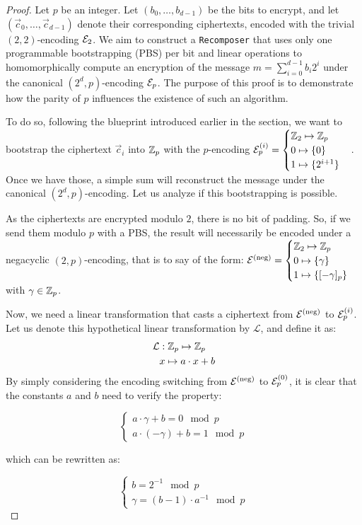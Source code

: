 \begin{proof}
Let $p$ be an integer. Let $(b_0, \dots, b_{d-1})$ be the bits to encrypt, and let $(\vec c_0, \dots, \vec c_{d - 1})$ denote their corresponding ciphertexts, encoded with the trivial $(2, 2)$-encoding $\mathcal{E}_2$. We aim to construct a \texttt{Recomposer} that uses only one programmable bootstrapping (\gls{PBS}) per bit and linear operations to homomorphically compute an encryption of the message $m = \sum_{i=0}^{d-1} b_i 2^i$ under the canonical $(2^d, p)$-encoding $\mathcal{E}_p$. The purpose of this proof is to demonstrate how the parity of $p$ influences the existence of such an algorithm.

To do so, following the blueprint introduced earlier in the section, we want to bootstrap the ciphertext $\vec c_i$ into $\mathbb{Z}_p$ with the $p$-encoding $\mathcal{E}_p^{(i)} = \begin{cases} \mathbb{Z}_2 \mapsto \mathbb{Z}_{p} \\ 0 \mapsto \{0\} \\ 1 \mapsto \{2^{i+1}\} \end{cases}$. Once we have those, a simple sum will reconstruct the message under the canonical $(2^d, p)$-encoding. Let us analyze if this bootstrapping is possible.

As the ciphertexts are encrypted modulo $2$, there is no bit of padding. So, if we send them modulo $p$ with a \gls{PBS}, the result will necessarily be encoded under a negacyclic $(2, p)$-encoding, that is to say of the form: $\mathcal{E}^{\text{(neg)}} = \begin{cases} \mathbb{Z}_2 \mapsto \mathbb{Z}_{p} \\ 0 \mapsto \{\gamma\} \\ 1 \mapsto \{[-\gamma]_p\} \end{cases}$ with $\gamma \in \mathbb{Z}_p$.

Now, we need a linear transformation that casts a ciphertext from $\mathcal{E}^{\text{(neg)}}$ to $\mathcal{E}_p^{(i)}$. Let us denote this hypothetical linear transformation by $\mathcal{L}$, and define it as: \begin{align*}
    \mathcal{L} &: \mathbb{Z}_p \mapsto \mathbb{Z}_p\\
    & x \mapsto a \cdot x + b
\end{align*} 
By simply considering the encoding switching from $\mathcal{E}^{\text{(neg)}}$ to $\mathcal{E}_p^{(0)}$, it is clear that the constants $a$ and $b$ need to verify the property:

\[
    \begin{cases}
        a \cdot \gamma + b = 0 \mod p\\
        a \cdot (- \gamma) + b = 1 \mod p 
    \end{cases}
\]

which can be rewritten as:

\[
    \begin{cases}
        b = 2^{-1} \mod p\\
        \gamma = (b - 1) \cdot a^{-1} \mod p
    \end{cases}
\]



\end{proof}
